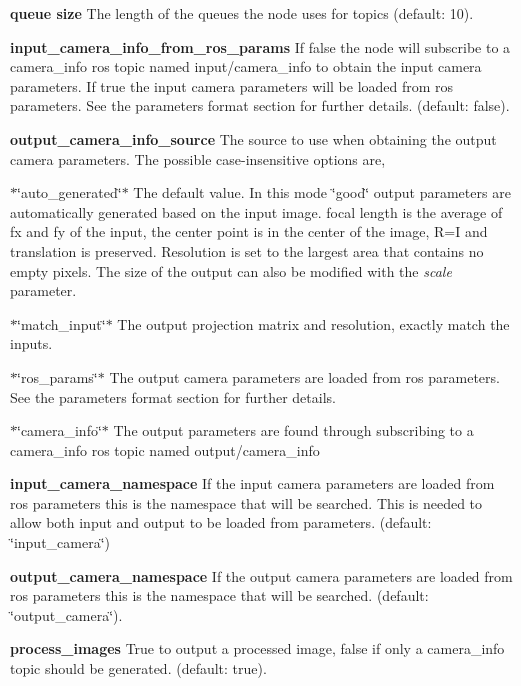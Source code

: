 \begin{DoxyItemize}
\item {\bfseries queue size} The length of the queues the node uses for topics (default\+: 10).
\item {\bfseries input\+\_\+camera\+\_\+info\+\_\+from\+\_\+ros\+\_\+params} If false the node will subscribe to a camera\+\_\+info ros topic named input/camera\+\_\+info to obtain the input camera parameters. If true the input camera parameters will be loaded from ros parameters. See the parameters format section for further details. (default\+: false).
\item {\bfseries output\+\_\+camera\+\_\+info\+\_\+source} The source to use when obtaining the output camera parameters. The possible case-\/insensitive options are,
\begin{DoxyItemize}
\item $\ast$\char`\"{}auto\+\_\+generated\char`\"{}$\ast$ The default value. In this mode \char`\"{}good\char`\"{} output parameters are automatically generated based on the input image. focal length is the average of fx and fy of the input, the center point is in the center of the image, R=I and translation is preserved. Resolution is set to the largest area that contains no empty pixels. The size of the output can also be modified with the {\itshape scale} parameter.
\item $\ast$\char`\"{}match\+\_\+input\char`\"{}$\ast$ The output projection matrix and resolution, exactly match the inputs.
\item $\ast$\char`\"{}ros\+\_\+params\char`\"{}$\ast$ The output camera parameters are loaded from ros parameters. See the parameters format section for further details.
\item $\ast$\char`\"{}camera\+\_\+info\char`\"{}$\ast$ The output parameters are found through subscribing to a camera\+\_\+info ros topic named output/camera\+\_\+info
\end{DoxyItemize}
\item {\bfseries input\+\_\+camera\+\_\+namespace} If the input camera parameters are loaded from ros parameters this is the namespace that will be searched. This is needed to allow both input and output to be loaded from parameters. (default\+: \char`\"{}input\+\_\+camera\char`\"{})
\item {\bfseries output\+\_\+camera\+\_\+namespace} If the output camera parameters are loaded from ros parameters this is the namespace that will be searched. (default\+: \char`\"{}output\+\_\+camera\char`\"{}).
\item {\bfseries process\+\_\+images} True to output a processed image, false if only a camera\+\_\+info topic should be generated. (default\+: true).

\end{DoxyItemize}
